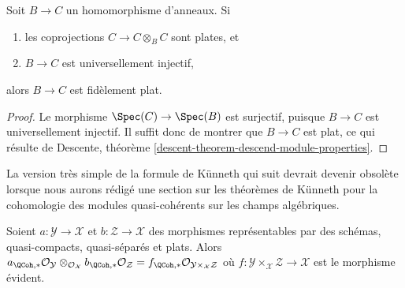 \begin{lemma}
\label{lemma-flat}
Soit $B \to C$ un homomorphisme d'anneaux. Si
\begin{enumerate}
\item les coprojections $C \to C \otimes_B C$ sont plates, et
\item $B \to C$ est universellement injectif,
\end{enumerate}
alors $B \to C$ est fidèlement plat.
\end{lemma}

\begin{proof}
Le morphisme $\Spec(C) \to \Spec(B)$ est surjectif, puisque $B \to C$ est universellement
injectif. Il suffit donc de montrer que $B \to C$ est plat,
ce qui résulte de
Descente, théorème \ref{descent-theorem-descend-module-properties}.
\end{proof}

\noindent
La version très simple de la formule de K\"unneth qui suit devrait devenir
obsolète lorsque nous aurons rédigé une section sur les théorèmes de K\"unneth pour la
cohomologie des modules quasi-cohérents sur les champs algébriques.

\begin{lemma}
\label{lemma-easy-kunneth}
Soient $a : \mathcal{Y} \to \mathcal{X}$ et $b : \mathcal{Z} \to \mathcal{X}$
des morphismes représentables par des schémas, quasi-compacts, quasi-séparés et plats.
Alors $a_{\QCoh, *}\mathcal{O}_\mathcal{Y}
\otimes_{\mathcal{O}_\mathcal{X}}
b_{\QCoh, *}\mathcal{O}_\mathcal{Z} =
f_{\QCoh, *}\mathcal{O}_{\mathcal{Y} \times_\mathcal{X} \mathcal{Z}}$
où $f : \mathcal{Y} \times_\mathcal{X} \mathcal{Z} \to \mathcal{X}$
est le morphisme évident.
\end{lemma}

